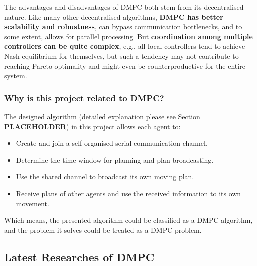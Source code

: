 The advantages and disadvantages of DMPC both stem from its decentralised nature. 
Like many other decentralised algorithms, \textbf{DMPC has better scalability and robustness}, can bypass communication bottlenecks, and to some extent, allows for parallel processing.
But \textbf{coordination among multiple controllers can be quite complex},
e.g., all local controllers tend to achieve Nash equilibrium for themselves, but such a tendency may not contribute to reaching Pareto optimality and might even be counterproductive for the entire system\cite{Nash_Equi}.

\subsubsection{Why is this project related to DMPC?}

The designed algorithm (detailed explanation please see Section \textbf{PLACEHOLDER}) in this project allows each agent to:
\begin{itemize}
  \item Create and join a self-organised serial communication channel.
  \item Determine the time window for planning and plan broadcasting.
  \item Use the shared channel to broadcast its own moving plan.
  \item Receive plans of other agents and use the received information to its own movement.
\end{itemize}

Which means, the presented algorithm could be classified as a DMPC algorithm, and the problem it solves could be treated as a DMPC problem.

\subsection{Latest Researches of DMPC}



